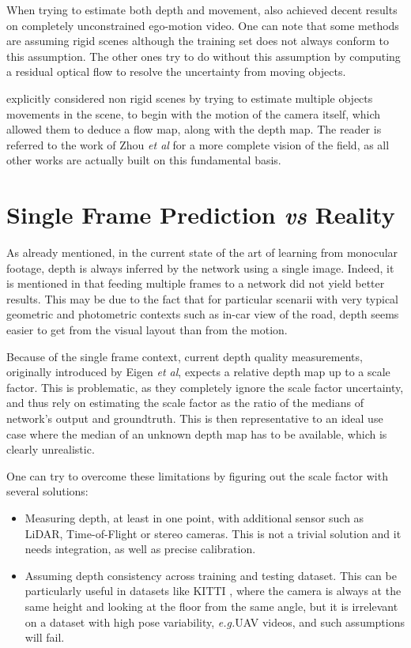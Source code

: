 \documentclass[runningheads]{llncs}
\def\eg{\emph{e.g.}\:}
\def\etal{\emph{et al}\:}
\begin{document}
When trying to estimate both depth and movement, \cite{zhou2017unsupervised, yin2018geonet, Mahjourian, DBLP:journals/corr/abs-1805-09806} also achieved decent results on completely unconstrained ego-motion video. One can note that some methods \cite{zhou2017unsupervised} are assuming rigid scenes although the training set does not always conform to this assumption. The other ones try to
do without this assumption by computing
a residual optical flow
to resolve
the uncertainty from moving objects.

\cite{Vijayanarasimhan17} explicitly considered non rigid scenes by trying to estimate multiple objects movements in the scene, to begin with the motion of the camera itself, which allowed them to deduce a flow map, along with the depth map. The reader is
referred to
the work of Zhou \etal \cite{zhou2017unsupervised} for a more complete vision of the field, as all other works
are actually built
on this fundamental basis.

\section{Single Frame Prediction
{\em vs}
Reality}

\label{section:critic}
As already mentioned, in the current state of the art
of
learning from monocular footage, depth is always inferred by the network using a single image. Indeed, it is mentioned in \cite{zhou2017unsupervised} that feeding multiple frames to a network did not yield better results. This may be due to the fact that for particular scenarii with very
typical geometric and photometric contexts
such as in-car view of the road, depth seems easier to get from the
visual layout
than from the motion.

Because of the single frame context, current depth quality measurements, originally introduced by Eigen \etal \cite{eigen2014depth}, expects a relative depth map up to a scale factor. This is problematic, as they completely ignore the scale factor uncertainty, and thus rely on
estimating the scale factor as
the ratio of the medians of network's output and groundtruth. This is then representative to an ideal use case where the median of an unknown depth map has to be available, which is clearly unrealistic.

One can try to overcome these limitations by figuring out the scale factor with several solutions:
\begin{itemize}
\item Measuring depth, at least in one point, with additional sensor such as LiDAR,
Time-of-Flight
or stereo cameras. This is not a trivial solution and it needs integration, as
well
as precise calibration.

\item Assuming depth consistency across training and testing dataset. This can be particularly useful in datasets like KITTI \cite{geiger2013vision}, where the camera is always at the same height and looking at the floor
from
the same angle, but it
is irrelevant on a dataset with high pose variability,
\eg UAV videos, and such assumptions will fail.
\end{itemize}
\end{document}
